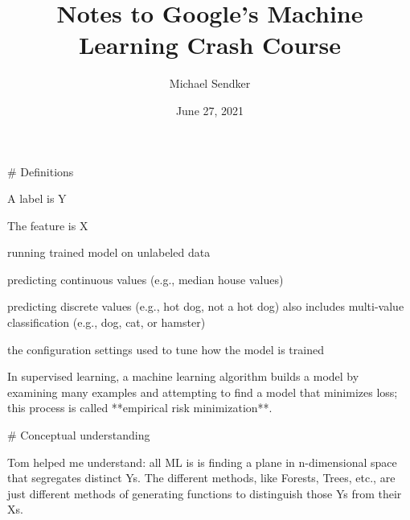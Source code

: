 

\title{Notes to Google's Machine Learning Crash Course}
\author{Michael Sendker}
\date{June 27, 2021}


\begin{markdown}
\maketitle

# Definitions

\begin{definition}[label]
    A label is Y
\end{definition}

\begin{definition}[feature]
    The feature is X
\end{definition}

\begin{definition}[inference]
    running trained model on unlabeled data
\end{definition}

\begin{definition}[regression]
    predicting continuous values (e.g., median house values)
\end{definition}

\begin{definition}[classification]
    predicting discrete values (e.g., hot dog, not a hot dog) also includes
    multi-value classification (e.g., dog, cat, or hamster)
\end{definition}

\begin{definition}[hyperparameters]
    the configuration settings used to tune how the model is trained
\end{definition}

\begin{definition}
    In supervised learning, a machine learning algorithm builds a model by
    examining many examples and attempting to find a model that minimizes loss;
    this process is called **empirical risk minimization**.
\end{definition}

# Conceptual understanding

Tom helped me understand: all ML is is finding a plane in n-dimensional space
that segregates distinct Ys. The different methods, like Forests, Trees, etc.,
are just different methods of generating functions to distinguish those Ys from
their Xs.


\end{markdown}
